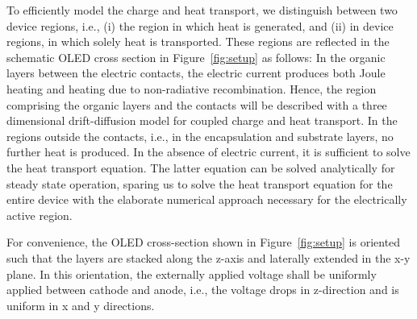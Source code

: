 \documentclass[%
9pt,
 aip,
rsi,%
 amsmath,amssymb,
preprint,%
]{revtex4-1}
\begin{document}
To efficiently model the charge and heat transport, we distinguish between two device regions, i.e., (i) the region in which heat is generated, and (ii) in device regions, in which solely heat is transported. 
These regions are reflected in the schematic OLED cross section in Figure~\ref{fig:setup} as follows:
In the organic layers between the electric contacts, the electric current produces both Joule heating and heating due to non-radiative recombination. 
Hence, the region comprising the organic layers and the contacts will be described with a three dimensional drift-diffusion model for coupled charge and heat transport.
In the regions outside the contacts, i.e., in the encapsulation and substrate layers, no further heat is produced. 
In the absence of electric current, it is sufficient to solve the heat transport equation.
The latter equation can be solved analytically for steady state operation, sparing us to solve the heat transport equation for the entire device with the  elaborate numerical approach necessary for the electrically active region.

For convenience, the OLED cross-section shown in Figure~\ref{fig:setup} is oriented such that the layers are stacked along the z-axis and laterally extended in the x-y plane.
In this orientation, the externally applied voltage shall be uniformly applied between cathode and anode, i.e., the voltage drops in z-direction and is uniform in x and y directions.
\end{document}
